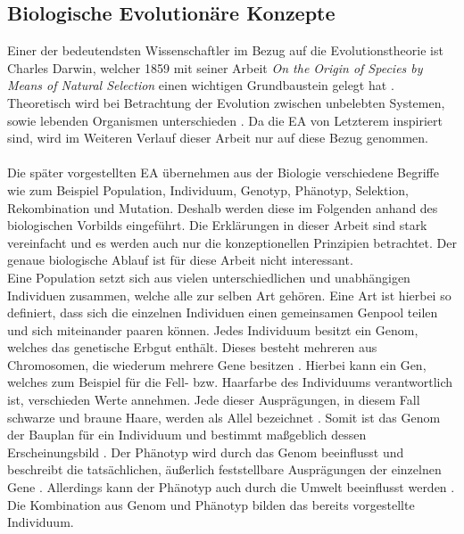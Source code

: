 \subsection{Biologische Evolutionäre Konzepte}
\label{subsec:biological_evolution}
Einer der bedeutendsten Wissenschaftler im Bezug auf die Evolutionstheorie ist Charles Darwin, welcher 1859 mit seiner Arbeit \emph{On the Origin of Species by Means of Natural Selection} einen wichtigen Grundbaustein gelegt hat \cite{russell2013kunstliche}. Theoretisch wird bei Betrachtung der Evolution zwischen unbelebten Systemen, sowie lebenden Organismen unterschieden \cite{weicker2015evolutionare}. Da die \ac{EA} von Letzterem inspiriert sind, wird im Weiteren Verlauf dieser Arbeit nur auf diese Bezug genommen.
\\\\
Die später vorgestellten \ac{EA} übernehmen aus der Biologie verschiedene Begriffe wie zum Beispiel Population, Individuum, Genotyp, Phänotyp, Selektion, Rekombination und Mutation. Deshalb werden diese im Folgenden anhand des biologischen Vorbilds eingeführt. Die Erklärungen in dieser Arbeit sind stark vereinfacht und es werden auch nur die konzeptionellen Prinzipien betrachtet. Der genaue biologische Ablauf ist für diese Arbeit nicht interessant.\\
Eine Population setzt sich aus vielen unterschiedlichen und unabhängigen Individuen zusammen, welche alle zur selben Art gehören. Eine Art ist hierbei so definiert, dass sich die einzelnen Individuen einen gemeinsamen Genpool teilen und sich miteinander paaren können. Jedes Individuum besitzt ein Genom, welches das genetische Erbgut enthält. Dieses besteht mehreren aus Chromosomen, die wiederum mehrere Gene besitzen \cite{weicker2015evolutionare}. Hierbei kann ein Gen, welches zum Beispiel für die Fell- bzw. Haarfarbe des Individuums verantwortlich ist, verschieden Werte annehmen. Jede dieser Ausprägungen, in diesem Fall schwarze und braune Haare, werden als Allel bezeichnet \cite{weicker2015evolutionare}. Somit ist das Genom der Bauplan für ein Individuum und bestimmt maßgeblich dessen Erscheinungsbild \cite{kirschbaum2008biopsychologie}. Der Phänotyp wird durch das Genom beeinflusst und beschreibt die tatsächlichen, äußerlich feststellbare Ausprägungen der einzelnen Gene \cite{weicker2015evolutionare}. Allerdings kann der Phänotyp auch durch die Umwelt beeinflusst werden \cite{kirschbaum2008biopsychologie}. Die Kombination aus Genom und Phänotyp bilden das bereits vorgestellte Individuum. 
\\\\
